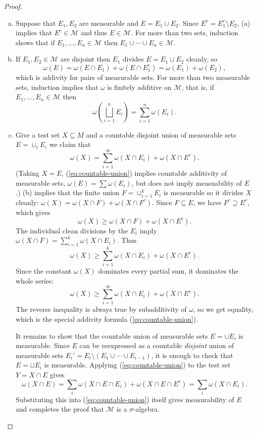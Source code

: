 \documentclass[11pt]{article}
\begin{document}
\begin{proof}
\begin{enumerate}[(a)]
    \item Suppose that $E_1, E_2$ are measurable and $E = E_1 \cup E_2$.  Since $E^c = E_1^c \setminus E_2$, (a) implies that $E^c \in \mathcal{M}$ and thus $E \in \mathcal{M}$.  For more than two sets, induction shows that if $E_1, \dots, E_n \in \mathcal{M}$ then $E_1 \cup \cdots \cup E_n \in \mathcal{M}$.

    \item If $E_1, E_2 \in \mathcal{M}$ are disjoint then $E_1$ divides $E = E_1 \sqcup E_2$ cleanly, so
      \[
	\omega(E) = \omega(E \cap E_1) + \omega(E \cap E_1^c) = \omega(E_1) + \omega(E_2),
      \]
      which is addivity for pairs of measurable sets.  For more than two measurable sets, induction implies that $\omega$ is finitely additive on $\mathcal{M}$, that is, if $E_1, \dots, E_n \in \mathcal{M}$ then
      \[
	\omega \left( \bigsqcup_{i=1}^n E_i \right) = \sum_{i=1}^n \omega(E_i).
      \]

    \item Give a test set $X \subseteq M$ and a countable disjoint union of measurable sets $E = \sqcup_{i} E_i$ we claim that
      \begin{equation}
	\label{eq:countable-union}
	\omega(X) = \sum_{i=1}^\infty \omega(X \cap E_i) + \omega(X \cap E^c).
      \end{equation}
      (Taking $X = E$, (\ref{eq:countable-union}) implies countable additivity of measurable sets, $\omega(E) = \sum \omega(E_i)$, but does not imply measuability of $E$.)  (b) implies that the finite union $F = \sqcup_{i=1}^k E_i$ is measurable so it divides $X$ cleanly: $\omega(X) = \omega(X \cap F) + \omega(X \cap F^c)$.  Since $F \subseteq E$, we have $F^c \supseteq E^c$, which gives
      \[
	\omega(X) \geqslant \omega(X \cap F) + \omega(X \cap E^c).
      \]
      The individual clean divisions by the $E_i$ imply $\omega(X \cap F) = \sum_{i=1}^k \omega(X \cap E_i)$.  Thus
      \[
	\omega(X) \geqslant \sum_{i=1}^k \omega(X \cap E_i) + \omega(X \cap E^c).
      \]
      Since the constant $\omega(X)$ dominates every partial sum, it dominates the whole series:
      \[
	\omega(X) \geqslant \sum_{i=1}^\infty \omega(X \cap E_i) + \omega(X \cap E^c).
      \]
      The reverse inequality is always true by subadditivity of $\omega$, so we get equality, which is the special addivity formula (\ref{eq:countable-union}).

      It remains to show that the countable union of measurable sets $E = \cup E_i$ is measurable.  Since $E$ can be reexpressed as a countable \textit{disjoint} union of measurable sets $E_i' = E_i \setminus (E_1 \cup \cdots \cup E_{i-1})$, it is enough to check that $E = \sqcup E_i$ is measurable.  Applying (\ref{eq:countable-union}) to the test set $Y = X \cap E$ gives
      \[
	\omega(X \cap E) = \sum_i \omega(X \cap E \cap E_i) + \omega(X \cap E \cap E^c) = \sum_i \omega(X \cap E_i).
      \]
      Substituting this into (\ref{eq:countable-union}) itself gives measurability of $E$ and completes the proof that $\mathcal{M}$ is a $\sigma$-algebra.
  \end{enumerate}
\end{proof}
\end{document}
